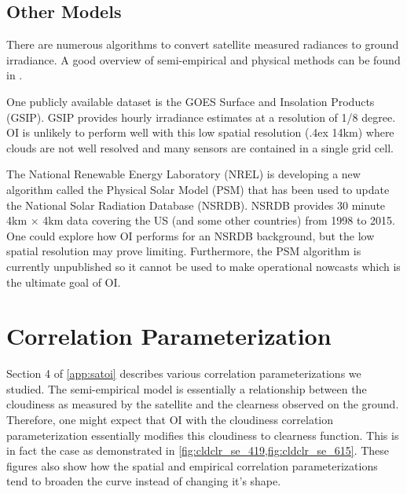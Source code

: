 \subsection{Other Models}
There are numerous algorithms to convert satellite measured radiances
to ground irradiance.
A good overview of semi-empirical and physical methods can be found in
\cite{Perez2013a,Miller2013}.

One publicly available dataset is the GOES Surface and Insolation
Products (GSIP).
GSIP provides hourly irradiance estimates at a resolution of 1/8
degree.
OI is unlikely to perform well with this low spatial resolution
({\raise.4ex \hbox{\texttildelow}}14km) where clouds are not well
resolved and many sensors are contained in a single grid cell.

The National Renewable Energy Laboratory (NREL) is developing a new
algorithm called the Physical Solar Model (PSM) that has been used to update
the National Solar Radiation Database (NSRDB).
NSRDB provides 30 minute 4km $\times$ 4km data covering the US (and
some other countries) from 1998 to 2015.
One could explore how OI performs for an NSRDB background, but the low
spatial resolution may prove limiting.
Furthermore, the PSM algorithm is currently unpublished so it cannot
be used to make operational nowcasts which is the ultimate goal of OI.

\section{Correlation Parameterization}
\label{sec:corr_param}
Section 4 of \cref{app:satoi} describes various correlation
parameterizations we studied.
The semi-empirical model is essentially a relationship between the
cloudiness as measured by the satellite and the clearness observed on
the ground.
Therefore, one might expect that OI with the cloudiness correlation
parameterization essentially modifies this cloudiness to clearness
function.
This is in fact the case as demonstrated in
\cref{fig:cldclr_se_419,fig:cldclr_se_615}.
These figures also show how the spatial and empirical correlation
parameterizations tend to broaden the curve instead of changing it's
shape.

